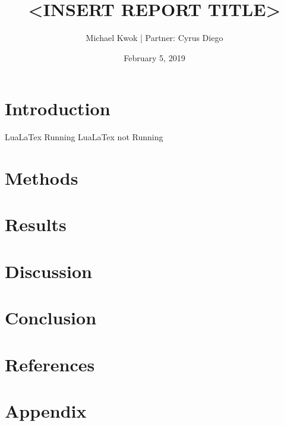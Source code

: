 \documentclass[12pt]{article}
\title{<INSERT REPORT TITLE>}
\date{February 5, 2019}
\author{Michael Kwok | Partner: Cyrus Diego }
\begin{document}
\maketitle
\pagebreak
\section{Introduction}

\ifLuaTeX
LuaLaTex Running
\else
LuaLaTex not Running
\fi

\section{Methods}
\section{Results}
\section{Discussion}
\section{Conclusion}
\pagebreak
\section*{References}
\pagebreak
\section*{Appendix}
\end{document}
